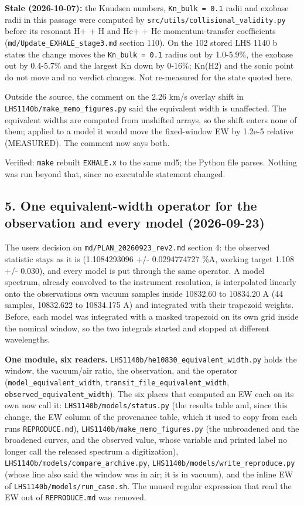 \documentclass[english,a4paper]{my_memo}
\begin{document}
\textbf{Stale (2026-10-07):} the Knudsen numbers, \texttt{Kn\_bulk\ =\ 0.1} radii and exobase radii in this passage were computed by \texttt{src/utils/collisional\_validity.py} before its resonant H+ + H and He+ + He momentum-transfer coefficients (\texttt{md/Update\_EXHALE\_stage3.md} section 110). On the 102 stored LHS 1140 b states the change moves the \texttt{Kn\_bulk\ =\ 0.1} radius out by 1.0-5.9\%, the exobase out by 0.4-5.7\% and the largest Kn down by 0-16\%; Kn(H2) and the sonic point do not move and no verdict changes. Not re-measured for the state quoted here.

Outside the source, the comment on the 2.26 km/s overlay shift in
\texttt{LHS1140b/make\_memo\_figures.py} said the equivalent width is unaffected. The
equivalent widths are computed from unshifted arrays, so the shift enters
none of them; applied to a model it would move the fixed-window EW by
1.2e-5 relative (MEASURED). The comment now says both.

Verified: \texttt{make} rebuilt \texttt{EXHALE.x} to the same md5; the Python file parses.
Nothing was run beyond that, since no executable statement changed.

\subsection{5. One equivalent-width operator for the observation and every model (2026-09-23)}\label{5-one-equivalent-width-operator-for-the-observation-and-every-model-2026-09-23}

The user\textquotesingle s decision on \texttt{md/PLAN\_20260923\_rev2.md} section 4: the observed
statistic stays as it is (1.1084293096 +/- 0.0294774727 \%A, working target
1.108 +/- 0.030), and every model is put through the same operator. A model
spectrum, already convolved to the instrument resolution, is interpolated
linearly onto the observation\textquotesingle s own vacuum samples inside 10832.60 to
10834.20 A (44 samples, 10832.622 to 10834.175 A) and integrated with their
trapezoid weights. Before, each model was integrated with a masked trapezoid
on its own grid inside the nominal window, so the two integrals started and
stopped at different wavelengths.

\textbf{One module, six readers.} \texttt{LHS1140b/he10830\_equivalent\_width.py} holds
the window, the vacuum/air ratio, the observation, and the operator
(\texttt{model\_equivalent\_width}, \texttt{transit\_file\_equivalent\_width},
\texttt{observed\_equivalent\_width}). The six places that computed an EW each on its
own now call it: \texttt{LHS1140b/models/status.py} (the results table and, since
this change, the EW column of the provenance table, which it used to copy
from each run\textquotesingle s \texttt{REPRODUCE.md}), \texttt{LHS1140b/make\_memo\_figures.py} (the
unbroadened and the broadened curves, and the observed value, whose variable
and printed label no longer call the released spectrum a digitization),
\texttt{LHS1140b/models/compare\_archive.py}, \texttt{LHS1140b/models/write\_reproduce.py}
(whose line also said the window was in air; it is in vacuum), and the inline
EW of \texttt{LHS1140b/models/run\_case.sh}. The unused regular expression that read
the EW out of \texttt{REPRODUCE.md} was removed.
\end{document}
